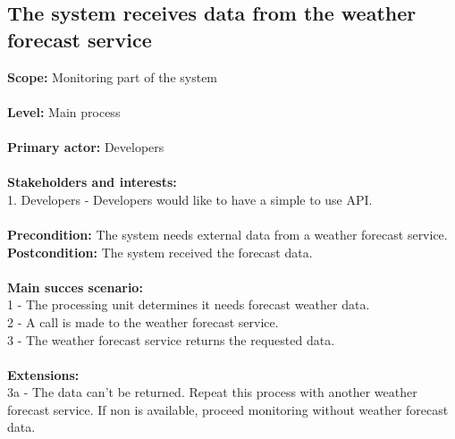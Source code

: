\subsection{The system receives data from the weather forecast service}
\textbf{Scope:} Monitoring part of the system\\\\
\textbf{Level:} Main process\\\\
\textbf{Primary actor:} Developers\\\\
\textbf{Stakeholders and interests:}\\
	1. Developers - Developers would like to have a simple to use API.\\\\
\textbf{Precondition:} The system needs external data from a weather forecast service.\\
\textbf{Postcondition:} The system received the forecast data.\\\\
\textbf{Main succes scenario:} \\
1 - The processing unit determines it needs forecast weather data.\\
2 - A call is made to the weather forecast service.\\
3 - The weather forecast service returns the requested data.\\\\
\textbf{Extensions:} \\
3a - The data can't be returned. Repeat this process with another weather forecast service. If non is available, proceed monitoring without weather forecast data.\\

